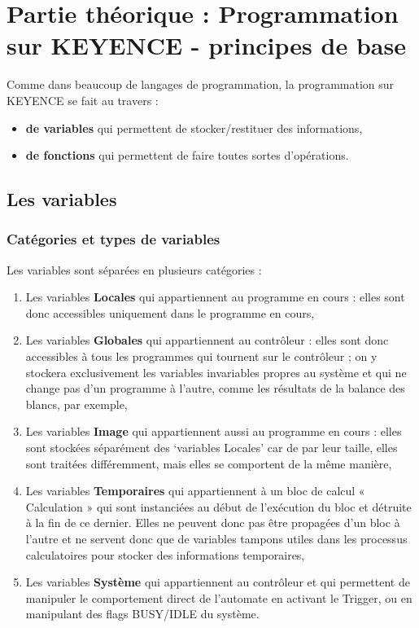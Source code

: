 \section{Partie théorique : Programmation sur KEYENCE - principes de base}
\noindent Comme dans beaucoup de langages de programmation, la programmation sur KEYENCE se fait au travers :
\begin{itemize}
\item \textbf{de variables} qui permettent de stocker/restituer des informations,
\item \textbf{de fonctions} qui permettent de faire toutes sortes d’opérations.
\end{itemize}


\subsection{Les variables}
\label{Sec.Variables}

\subsubsection{Catégories et types de variables}
\label{Sec.Variables_CatTypes}
\noindent Les variables sont séparées en plusieurs catégories :
\begin{enumerate}
  \item Les variables \textbf{Locales} qui appartiennent au programme en cours : 
  elles sont donc accessibles uniquement dans le programme en cours,
  \item Les variables \textbf{Globales} qui appartiennent au contrôleur : elles 
  sont donc accessibles à tous les programmes qui tournent sur le contrôleur ; on 
  y stockera exclusivement les variables invariables propres au système et qui ne
  change pas d’un programme à l’autre, comme les résultats de la balance des blancs,
  par exemple,
  \item Les variables \textbf{Image} qui appartiennent aussi au programme en 
  cours : elles sont stockées séparément des ‘variables Locales’ car de par leur taille,
  elles sont traitées différemment, mais elles se comportent de la même manière,
  \item Les variables \textbf{Temporaires} qui appartiennent à un bloc de calcul 
  « Calculation » qui sont instanciées au début de l’exécution du bloc et détruite à
  la fin de ce dernier. Elles ne peuvent donc pas être propagées d’un bloc à l’autre
  et ne servent donc que de variables tampons utiles dans les processus calculatoires
  pour stocker des informations temporaires,
  \item Les variables \textbf{Système} qui appartiennent au contrôleur et qui
  permettent de manipuler le comportement direct de l’automate en activant le 
  Trigger, ou en manipulant des flags BUSY/IDLE du système.
\end{enumerate}


